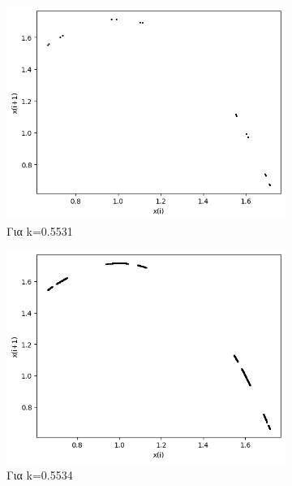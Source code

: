 \begin{figure}[h!]
	\begin{subfigure}[b]{0.4\textwidth}
		\centering
		\includegraphics[width=\textwidth]{LateX images/graphs q05/g7}
		\caption{Για k=0.5531}
		\label{f:k31}
	\end{subfigure}
	\hfill
	\begin{subfigure}[b]{0.4\textwidth}
		\centering
		\includegraphics[width=\textwidth]{LateX images/graphs q05/g8}
		\caption{Για k=0.5534}
		\label{f:k32}
	\end{subfigure}
	\hfill
	\begin{subfigure}[c]{0.4\textwidth}
		\centering

\end{subfigure}
\end{figure}

